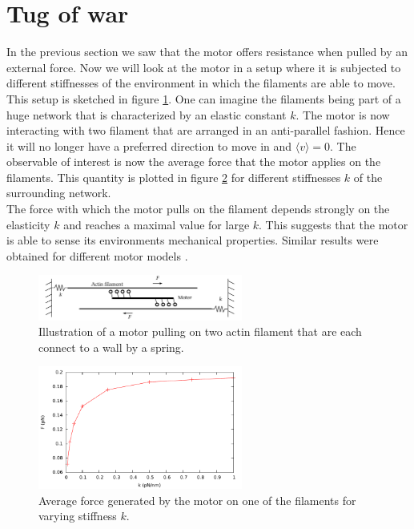 \documentclass[aps,pre,onecolumn,showpacs,showkeys,a4paper]{revtex4}
\begin{document}
\section{Tug of war}
In the previous section we saw that the motor offers resistance when pulled by an external force. Now we will look at the motor in a setup where it is subjected to different stiffnesses of the environment in which the filaments are able to move. This setup is sketched in figure \ref{Fig: tug}. One can imagine the filaments being part of a huge network that is characterized by an elastic constant $k$. The motor is now interacting with two filament that are arranged in an anti-parallel fashion. Hence it will no longer have a preferred direction to move in and $\langle v\rangle=0$. The observable of interest is now the average force that the motor applies on the filaments. This quantity is plotted in figure \ref{Fig: tug_k} for different stiffnesses $k$ of the surrounding network. \\
The force with which the motor pulls on the filament depends strongly on the elasticity $k$ and reaches a maximal value for large $k$. This suggests that the motor is able to sense its environments mechanical properties. Similar results were obtained for different motor models \cite{stam2015isoforms,albert2014stochastic}.


\begin{figure}[h]
\centering
\includegraphics[width=0.6\textwidth,height=!]{tug}
\caption{Illustration of a motor pulling on two actin filament that are each connect to a wall by a spring.}
\label{Fig: tug}
\end{figure}
\begin{figure}[h]
\centering
\includegraphics[width=0.6\textwidth,height=!]{tug_k}
\caption{Average force generated by the motor on one of the filaments for varying stiffness $k$.}
\label{Fig: tug_k}
\end{figure}
\end{document}
